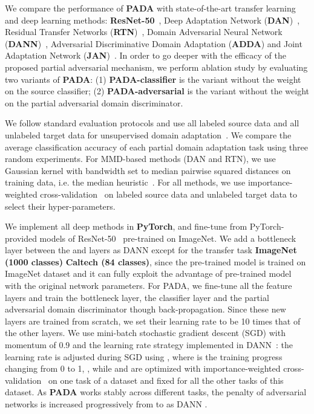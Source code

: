 \documentclass[runningheads]{llncs}
\begin{document}
We compare the performance of \textbf{PADA} with state-of-the-art transfer learning and deep learning methods: \textbf{ResNet-50}~\cite{cite:CVPR16DRL}, Deep Adaptation Network (\textbf{DAN})~\cite{cite:ICML15DAN}, Residual Transfer Networks (\textbf{RTN})~\cite{cite:NIPS16RTN}, Domain Adversarial Neural Network (\textbf{DANN})~\cite{cite:ICML15RevGrad}, Adversarial Discriminative Domain Adaptation (\textbf{ADDA}) \cite{cite:CVPR17ADDA} and Joint Adaptation Network (\textbf{JAN})~\cite{cite:ICML17JAN}. In order to go deeper with the efficacy of the proposed partial adversarial mechanism, we perform ablation study by evaluating two variants of \textbf{PADA}: (1) \textbf{PADA-classifier} is the variant without the weight on the source classifier; (2) \textbf{PADA-adversarial} is the variant without the weight on the partial adversarial domain discriminator.

We follow standard evaluation protocols and use all labeled source data and all unlabeled target data for unsupervised domain adaptation~\cite{cite:ECCV10Office,cite:ICML15DAN}. We compare the average classification accuracy of each partial domain adaptation task using three random experiments. For MMD-based methods (DAN and RTN), we use Gaussian kernel with bandwidth set to median pairwise squared distances on training data, i.e. the median heuristic~\cite{cite:NIPS12MKMMD}. For all methods, we use importance-weighted cross-validation~\cite{cite:JMLR07IWCV} on labeled source data and unlabeled target data to select their hyper-parameters.

We implement all deep methods in \textbf{PyTorch}, and fine-tune from PyTorch-provided models of ResNet-50~\cite{cite:NIPS12CNN} pre-trained on ImageNet. We add a bottleneck layer between the  and  layers as DANN \cite{cite:ICML15RevGrad} except for the transfer task \textbf{ImageNet (1000 classes)}  \textbf{Caltech (84 classes)}, since the pre-trained model is trained on ImageNet dataset and it can fully exploit the advantage of pre-trained model with the original network parameters. For PADA, we fine-tune all the feature layers and train the bottleneck layer, the classifier layer and the partial adversarial domain discriminator though back-propagation. Since these new layers are trained from scratch, we set their learning rate to be 10 times that of the other layers. We use mini-batch stochastic gradient descent (SGD) with momentum of 0.9 and the learning rate strategy implemented in DANN~\cite{cite:ICML15RevGrad}: the learning rate is adjusted during SGD using , where  is the training progress changing from 0 to 1,  , while  and  are optimized with importance-weighted cross-validation~\cite{cite:JMLR07IWCV} on one task of a dataset and fixed for all the other tasks of this dataset. As \textbf{PADA} works stably across different tasks, the penalty of adversarial networks is increased progressively from  to  as DANN \cite{cite:ICML15RevGrad}. 
\end{document}
